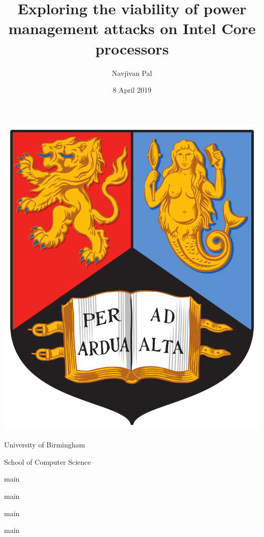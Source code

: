 



\title{Exploring the viability of power management attacks on Intel Core processors}
\author{Navjivan Pal}
\date{8 April 2019}

\makeatletter
\begin{titlepage}
    \begin{center}
        \vspace*{\fill}
        \textbf{\Huge \@title}

        \vspace{1em}
        \textbf{\LARGE \@author}

        \vspace{1em}
        \includegraphics[height=0.3\paperheight,keepaspectratio]{uob-crest.png}

        \vspace{1em}
        {\Large
            University of Birmingham

            \vspace*{0.5em}
            School of Computer Science
        }

        \vspace*{\fill}
    \end{center}
\end{titlepage}
\makeatother



\tableofcontents
\newpage

{main}

{main}

{main}

{main}

\printbibliography


